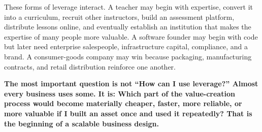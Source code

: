 These forms of leverage interact. A teacher may begin with expertise, convert it into a curriculum, recruit other instructors, build an assessment platform, distribute lessons online, and eventually establish an institution that makes the expertise of many people more valuable. A software founder may begin with code but later need enterprise salespeople, infrastructure capital, compliance, and a brand. A consumer-goods company may win because packaging, manufacturing contracts, and retail distribution reinforce one another.

\textbf{The most important question is not ``How can I use leverage?'' Almost every business uses some. It is: Which part of the value-creation process would become materially cheaper, faster, more reliable, or more valuable if I built an asset once and used it repeatedly? That is the beginning of a scalable business design.}
